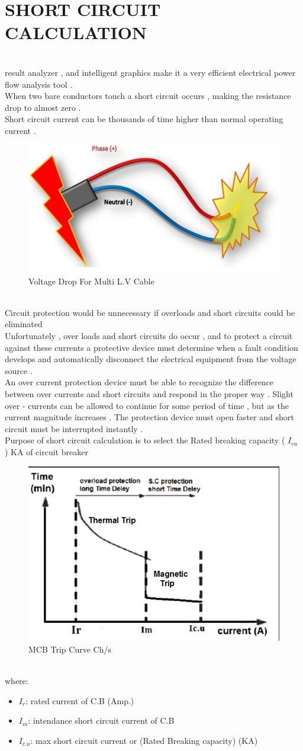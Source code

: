 \documentclass[12pt,fleqn]{book} %
\begin{document}
\section {SHORT CIRCUIT CALCULATION }
\\result analyzer , and intelligent graphics make it a very efficient electrical power flow analysis tool . 
\\When two bare conductors touch a short circuit occurs , making the resistance drop to almost zero . 
\\Short circuit current can be thousands of time higher than normal operating current . 
\begin{figure}[h!]
    \centering
    \includegraphics[width=0.4\linewidth]{yousef 10.png}
    \caption{  Voltage Drop For Multi L.V Cable }
    \label{fig:yousef10}
\end{figure}
\\ Circuit protection would be unnecessary if overloads and short circuits could be eliminated
\\Unfortunately , over loads and short circuits do occur , and to protect a circuit against these currents a protective device must determine when a fault condition develops and automatically disconnect the electrical equipment from the voltage source .
\\An over current protection device must be able to recognize the difference between over currents and short circuits and respond in the proper way . Slight over - currents can be allowed to continue for some period of time , but as the current magnitude increases .
The protection device must open faster and short circuit must be interrupted instantly .
\\Purpose of short circuit calculation is to select the Rated breaking capacity ( $I_{cu}$ ) KA of circuit breaker 
\begin{figure}[h!]
    \centering
    \includegraphics[width=0.4\linewidth]{yousef 11.png}
    \caption{MCB Trip Curve Ch/s}
    \label{fig:yousef11}
\end{figure}
\\where:
\begin{itemize}
    \item $I_{r}$: rated current of C.B (Amp.)
    \item $I_{m}$: intendance short circuit current of C.B
    \item $I_{c.u}$: max short circuit current or (Rated Breaking capacity) (KA)
     \end{itemize}
\end{document}
